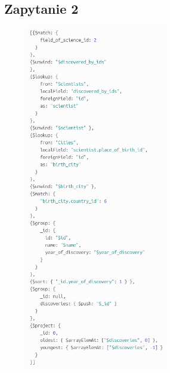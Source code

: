 \documentclass[11pt]{article}
\begin{document}
\newpage
	\subsection{Zapytanie 2}
		\begin{figure}[!ht]
			\begin{center}
				\includegraphics[width=230px]{m2.png}
			\end{center}
		\end{figure}

\newpage
\end{document}
